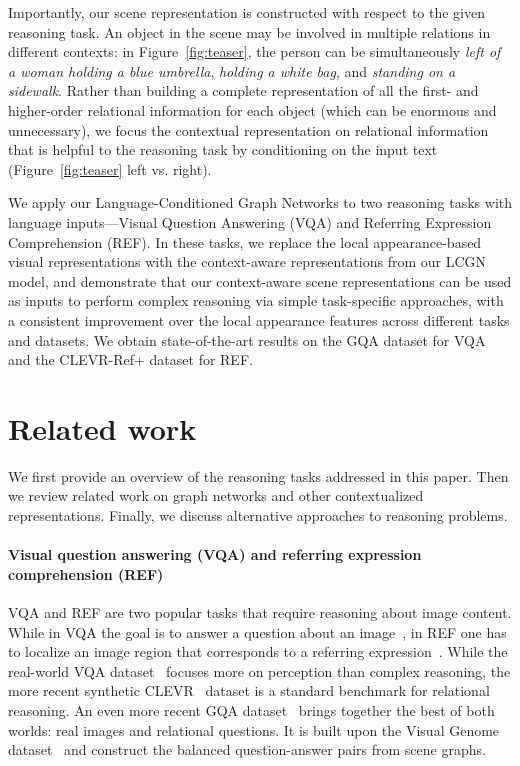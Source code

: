 \documentclass[10pt,twocolumn,letterpaper]{article}
\begin{document}
Importantly, our scene representation is constructed with respect to the given reasoning task. An object in the scene may be involved in multiple relations in different contexts: in Figure~\ref{fig:teaser}, the person can be simultaneously \textit{left of a woman holding a blue umbrella}, \textit{holding a white bag}, and \textit{standing on a sidewalk}. Rather than building a complete representation of all the first- and higher-order relational information for each object (which can be enormous and unnecessary), we focus the contextual representation on relational information that is helpful to the reasoning task by conditioning on the input text (Figure~\ref{fig:teaser} left vs. right).

We apply our Language-Conditioned Graph Networks to two reasoning tasks with language inputs---Visual Question Answering (VQA) and Referring Expression Comprehension (REF). 
In these tasks, we replace the local appearance-based visual representations with the context-aware representations from our LCGN model, and demonstrate that our context-aware scene representations can be used as inputs to perform complex reasoning via simple task-specific approaches, with a consistent improvement over the local appearance features across different tasks and datasets. We obtain state-of-the-art results on the GQA dataset \cite{hudson2019gqa} for VQA and the CLEVR-Ref+ dataset \cite{liu2019clevr} for REF. 
 \section{Related work}
\label{sec:related}

We first provide an overview of the reasoning tasks addressed in this paper. Then we review related work on graph networks and other contextualized representations. Finally, we discuss alternative approaches to reasoning problems.

\vspace{-1em}
\paragraph{Visual question answering (VQA) and referring expression comprehension (REF)} VQA and REF are two popular tasks that require reasoning about image content. While in VQA the goal is to answer a question about an image~\cite{antol2015vqa}, in REF one has to localize an image region that corresponds to a referring expression~\cite{mao2016generation}. While the real-world VQA dataset~\cite{antol2015vqa,goyal2017making} focuses more on perception than complex reasoning, the more recent synthetic CLEVR~\cite{johnson2017clevr} dataset is a standard benchmark for relational reasoning. An even more recent GQA dataset~\cite{hudson2019gqa} brings together the best of both worlds: real images and relational questions. It is built upon the Visual Genome dataset~\cite{krishna2017visual} and construct the balanced question-answer pairs from scene graphs.
\end{document}
